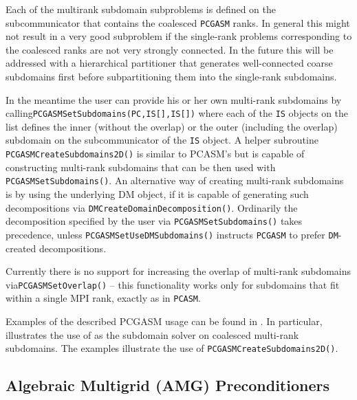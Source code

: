 Each of the multirank subdomain subproblems is defined on the subcommunicator that contains the coalesced
\lstinline{PCGASM} ranks.  In general this might not result in a very good subproblem if the single-rank problems
corresponding to the coalesced ranks are not very strongly connected.  In the future this will be addressed
with a hierarchical partitioner that generates well-connected coarse subdomains first before subpartitioning
them into the single-rank subdomains.

In the meantime the user can provide his or her own multi-rank subdomains by calling\break \lstinline{PCGASMSetSubdomains(PC,IS[],IS[])}
where each of the \lstinline{IS} objects on the list defines the inner (without the overlap) or the outer (including the overlap)
subdomain on the subcommunicator of the \lstinline{IS} object.  A helper subroutine \lstinline{PCGASMCreateSubdomains2D()} is similar
to PCASM's but is capable of constructing multi-rank subdomains that can be then used with \lstinline{PCGASMSetSubdomains()}.
An alternative way of creating multi-rank subdomains is by using the underlying DM object, if it is capable of generating
such decompositions via \lstinline{DMCreateDomainDecomposition()}. Ordinarily the decomposition specified by the user via
\lstinline{PCGASMSetSubdomains()} takes precedence, unless \lstinline{PCGASMSetUseDMSubdomains()} instructs \lstinline{PCGASM} to prefer \lstinline{DM}-created
decompositions.

Currently there is no support for increasing the overlap of multi-rank subdomains via\break \lstinline{PCGASMSetOverlap()} -- this
functionality works only for subdomains that fit within a single MPI rank, exactly as in \lstinline{PCASM}.

Examples of the described PCGASM usage can be found in \href{http://www.mcs.anl.gov/petsc/petsc-current/docs/manualpages/PC/PCGASM.html}{}.
In particular, 
illustrates the use of  as the subdomain solver on
coalesced multi-rank subdomains. The  examples illustrate the use of \lstinline{PCGASMCreateSubdomains2D()}.


\subsection{Algebraic Multigrid (AMG) Preconditioners}
\label{sec_amg}

